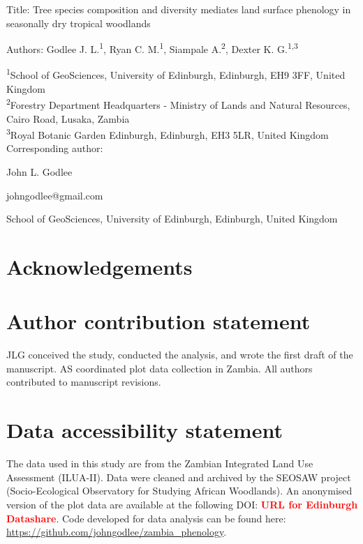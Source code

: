 \documentclass[11pt,a4paper]{article}
\newcommand{\todo}[1]{\textcolor{red}{\textbf{#1}}}   %
\begin{document}
{\Large{Title: Tree species composition and diversity mediates land surface phenology in seasonally dry tropical woodlands}}

Authors: Godlee J. L.\textsuperscript{1}, Ryan C. M.\textsuperscript{1}, Siampale A.\textsuperscript{2}, Dexter K. G.\textsuperscript{1,3}

\textsuperscript{1}School of GeoSciences, University of Edinburgh, Edinburgh, EH9 3FF, United Kingdom \\
\textsuperscript{2}Forestry Department Headquarters - Ministry of Lands and Natural Resources, Cairo Road, Lusaka, Zambia \\
\textsuperscript{3}Royal Botanic Garden Edinburgh, Edinburgh, EH3 5LR, United Kingdom \\

\vspace{1em}
Corresponding author:

John L. Godlee

johngodlee@gmail.com

School of GeoSciences, University of Edinburgh, Edinburgh, United Kingdom

\section*{Acknowledgements}

\section*{Author contribution statement}

JLG conceived the study, conducted the analysis, and wrote the first draft of the manuscript. AS coordinated plot data collection in Zambia. All authors contributed to manuscript revisions. 

\section*{Data accessibility statement}

The data used in this study are from the Zambian Integrated Land Use Assessment (ILUA-II). Data were cleaned and archived by the SEOSAW project (Socio-Ecological Observatory for Studying African Woodlands). An anonymised version of the plot data are available at the following DOI: \todo{URL for Edinburgh Datashare}. Code developed for data analysis can be found here: \url{https://github.com/johngodlee/zambia_phenology}.

\newpage{}
\linenumbers
\end{document}
